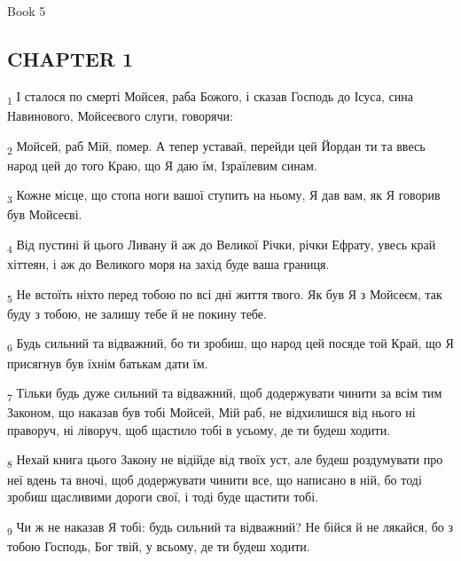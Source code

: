 Book 5
\subsection{CHAPTER 1}
\begin{tcolorbox}
\textsubscript{1} І сталося по смерті Мойсея, раба Божого, і сказав Господь до Ісуса, сина Навинового, Мойсеєвого слуги, говорячи:
\end{tcolorbox}
\begin{tcolorbox}
\textsubscript{2} Мойсей, раб Мій, помер. А тепер уставай, перейди цей Йордан ти та ввесь народ цей до того Краю, що Я даю їм, Ізраїлевим синам.
\end{tcolorbox}
\begin{tcolorbox}
\textsubscript{3} Кожне місце, що стопа ноги вашої ступить на ньому, Я дав вам, як Я говорив був Мойсеєві.
\end{tcolorbox}
\begin{tcolorbox}
\textsubscript{4} Від пустині й цього Ливану й аж до Великої Річки, річки Ефрату, увесь край хіттеян, і аж до Великого моря на захід буде ваша границя.
\end{tcolorbox}
\begin{tcolorbox}
\textsubscript{5} Не встоїть ніхто перед тобою по всі дні життя твого. Як був Я з Мойсеєм, так буду з тобою, не залишу тебе й не покину тебе.
\end{tcolorbox}
\begin{tcolorbox}
\textsubscript{6} Будь сильний та відважний, бо ти зробиш, що народ цей посяде той Край, що Я присягнув був їхнім батькам дати їм.
\end{tcolorbox}
\begin{tcolorbox}
\textsubscript{7} Тільки будь дуже сильний та відважний, щоб додержувати чинити за всім тим Законом, що наказав був тобі Мойсей, Мій раб, не відхилишся від нього ні праворуч, ні ліворуч, щоб щастило тобі в усьому, де ти будеш ходити.
\end{tcolorbox}
\begin{tcolorbox}
\textsubscript{8} Нехай книга цього Закону не відійде від твоїх уст, але будеш роздумувати про неї вдень та вночі, щоб додержувати чинити все, що написано в ній, бо тоді зробиш щасливими дороги свої, і тоді буде щастити тобі.
\end{tcolorbox}
\begin{tcolorbox}
\textsubscript{9} Чи ж не наказав Я тобі: будь сильний та відважний? Не бійся й не лякайся, бо з тобою Господь, Бог твій, у всьому, де ти будеш ходити.
\end{tcolorbox}
